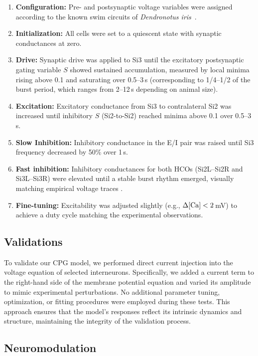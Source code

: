 \documentclass[nofootinbib,aip,amsmath,amssymb,reprint,twocolumn,10pt]{revtex4-2}
\begin{document}
\begin{enumerate}
  \item \textbf{Configuration:} Pre- and postsynaptic voltage variables were assigned according to the known swim circuits of \textit{Dendronotus iris}~\cite{SakuraiKatz2016}.
  \item \textbf{Initialization:} All cells were set to a quiescent state with synaptic conductances at zero.
  \item \textbf{Drive:} Synaptic drive was applied to Si3 until the excitatory postsynaptic gating variable $S$ showed sustained accumulation, measured by local minima rising above 0.1 and saturating over 0.5--3\,s (corresponding to 1/4--1/2 of the burst period, which ranges from 2--12\,s depending on animal size).
  \item \textbf{Excitation:} Excitatory conductance from Si3 to contralateral Si2 was increased until inhibitory $S$ (Si2-to-Si2) reached minima above 0.1 over 0.5--3\,s.
  \item \textbf{Slow Inhibition:} Inhibitory conductance in the E/I pair was raised until Si3 frequency decreased by 50\% over 1\,s.
  \item \textbf{Fast inhibition:} Inhibitory conductances for both HCOs (Si2L--Si2R and Si3L--Si3R) were elevated until a stable burst rhythm emerged, visually matching empirical voltage traces \cite{SakuraiKatz2016}.
  \item \textbf{Fine-tuning:} Excitability was adjusted slightly (e.g., $\Delta [\rm Ca] < 2$\,mV) to achieve a duty cycle matching the experimental observations.
\end{enumerate}

\subsection{Validations}
%
To validate our CPG model, we performed direct current injection into the voltage equation of selected interneurons. Specifically, we added a current term to the right-hand side of the membrane potential equation and varied its amplitude to mimic experimental perturbations. No additional parameter tuning, optimization, or fitting procedures were employed during these tests. This approach ensures that the model's responses reflect its intrinsic dynamics and structure, maintaining the integrity of the validation process.

\subsection{Neuromodulation}
\end{document}
